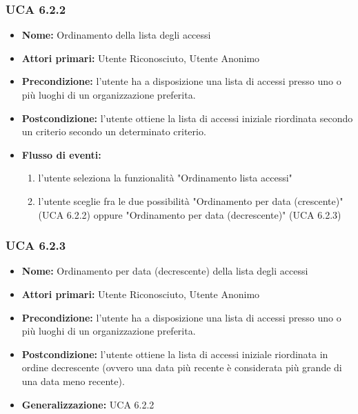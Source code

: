 \subsubsection{UCA 6.2.2}
\begin{itemize}
    \item \textbf{Nome:} Ordinamento della lista degli accessi
    \item \textbf{Attori primari:} Utente Riconosciuto, Utente Anonimo
    \item \textbf{Precondizione:} l’utente ha a disposizione una lista di accessi presso uno o più luoghi di un organizzazione preferita.
    \item \textbf{Postcondizione:} l’utente ottiene la lista di accessi iniziale riordinata secondo un criterio secondo un determinato criterio.
    \item \textbf{Flusso di eventi:}
    \begin{enumerate}
            \item l'utente seleziona la funzionalità "Ordinamento lista accessi"
            \item l'utente sceglie fra le due possibilità "Ordinamento per data (crescente)" (UCA 6.2.2) oppure "Ordinamento per data (decrescente)" (UCA 6.2.3)
    \end{enumerate}
\end{itemize}

\subsubsection{UCA 6.2.3}
\begin{itemize}
    \item \textbf{Nome:} Ordinamento per data (decrescente) della lista degli accessi
    \item \textbf{Attori primari:} Utente Riconosciuto, Utente Anonimo
    \item \textbf{Precondizione:} l’utente ha a disposizione una lista di accessi presso uno o più luoghi di un organizzazione preferita.
    \item \textbf{Postcondizione:} l’utente ottiene la lista di accessi iniziale riordinata in ordine decrescente (ovvero una data più recente è considerata più grande di una data meno recente).
    \item \textbf{Generalizzazione:} UCA 6.2.2
\end{itemize}

